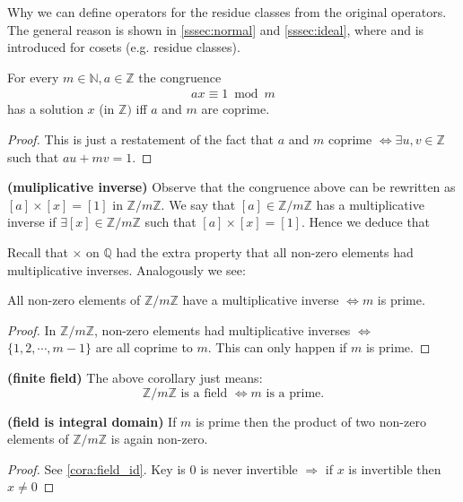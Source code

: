 \documentclass{article}
\newcommand{\bfs}[1]{\textbf{({#1}) }}
\begin{document}
\begin{rema}
Why we can define operators for the residue classes from the original operators. The general reason is shown in \cref{sssec:normal} and \cref{sssec:ideal}, where  and  is introduced for cosets (e.g. residue classes).
\end{rema}
\begin{thma}
For every $m \in \mathbb{N}, a \in \mathbb{Z}$ the congruence
\begin{align*}
a x \equiv 1 \bmod m
\end{align*}
has a solution $x$ (in $\mathbb{Z})$ iff $a$ and $m$ are coprime.
\end{thma}
\begin{proof}
This is just a restatement of the fact that $a$ and $m$ coprime $\Longleftrightarrow \exists u, v \in \mathbb{Z}$ such that $a u+m v=1$.
\end{proof}
\begin{rema}{\bfs{muliplicative inverse}}
Observe that the congruence above can be rewritten as $[a] \times[x]=[1]$ in $\mathbb{Z} / m \mathbb{Z} .$ We say that $[a] \in \mathbb{Z} / m \mathbb{Z}$ has a multiplicative inverse if $\exists[x] \in \mathbb{Z} / m \mathbb{Z}$ such that $[a] \times[x]=[1] .$ Hence we deduce that 

\centerline{}
\end{rema}


Recall that $\times$ on $\mathbb{Q}$ had the extra property that all non-zero elements had multiplicative inverses. Analogously we see: 

\begin{cora}
All non-zero elements of $\mathbb{Z} / m \mathbb{Z}$ have a multiplicative inverse $\Longleftrightarrow m$ is prime.
\end{cora}
\begin{proof} $\text{In } \mathbb{Z} / m \mathbb{Z}$, non-zero elements had multiplicative inverses $\Longleftrightarrow$ $\{1,2, \cdots, m-1\}$ are all coprime to $m$. This can only happen if $m$ is prime.
\end{proof}
\begin{rema}{\bfs{finite field}}\label{rem:oindnaf} The above corollary just means:
$$\mathbb{Z} / m \mathbb{Z}\text{ is a field }\Longleftrightarrow m \text{ is a prime.}$$
\end{rema}

\begin{cora}{\bfs{field is integral domain}}\label{cor:idc}
 If $m$ is prime then the product of two non-zero elements of $\mathbb{Z} / m \mathbb{Z}$ is again non-zero.
\end{cora} 
\begin{proof}
See \cref{cora:field_id}. Key is $0$ is never invertible $\Longrightarrow$ if $x$ is invertible then $x\ne 0$
\end{proof}
\end{document}

